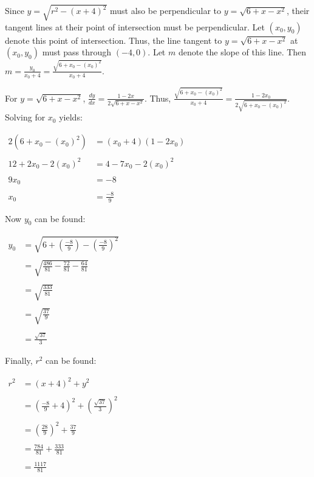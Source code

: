 \documentclass[12pt]{article}
\begin{document}
Since $y=\sqrt{r^2-(x+4)^2}$ must also be perpendicular to $y=\sqrt{6+x-x^2}$, their tangent lines at their point of intersection must be perpendicular.  Let $(x_0,y_0)$ denote this point of intersection.  Thus, the line tangent to $y=\sqrt{6+x-x^2}$ at $(x_0,y_0)$ must pass through $(-4,0)$.  Let $m$ denote the slope of this line.  Then $\displaystyle m=\frac{y_0}{x_0+4}=\frac{\sqrt{6+x_0-(x_0)^2}}{x_0+4}$.

For $y=\sqrt{6+x-x^2}$, $\displaystyle \frac{dy}{dx}=\frac{1-2x}{2\sqrt{6+x-x^2}}$.  Thus, $\displaystyle \frac{\sqrt{6+x_0-(x_0)^2}}{x_0+4}=\frac{1-2x_0}{2\sqrt{6+x_0-(x_0)^2}}$.  Solving for $x_0$ yields:

\begin{center}
$\begin{array}{rl}
2(6+x_0-(x_0)^2) & =(x_0+4)(1-2x_0) \\
& \\
12+2x_0-2(x_0)^2 & =4-7x_0-2(x_0)^2 \\
& \\
9x_0 & =-8 \\
& \\
x_0 & \displaystyle =\frac{-8}{9} \end{array}$
\end{center}

Now $y_0$ can be found:

\begin{center}
$\begin{array}{rl}
y_0 & \displaystyle =\sqrt{6+\left( \frac{-8}{9} \right)-\left( \frac{-8}{9} \right)^2} \\
& \\
& \displaystyle =\sqrt{\frac{486}{81}-\frac{72}{81}-\frac{64}{81}} \\
& \\
& \displaystyle =\sqrt{\frac{333}{81}} \\
& \\
& \displaystyle =\sqrt{\frac{37}{9}} \\
& \\
& \displaystyle =\frac{\sqrt{37}}{3} \end{array}$
\end{center}

Finally, $r^2$ can be found:

\begin{center}
$\begin{array}{rl}
r^2 & =(x+4)^2+y^2 \\
& \\
& \displaystyle =\left(\frac{-8}{9}+4\right)^2+\left(\frac{\sqrt{37}}{3}\right)^2 \\
& \\
& \displaystyle =\left(\frac{28}{9}\right)^2+\frac{37}{9} \\
& \\
& \displaystyle =\frac{784}{81}+\frac{333}{81} \\
& \\
& \displaystyle =\frac{1117}{81} \end{array}$
\end{center}
\end{document}
